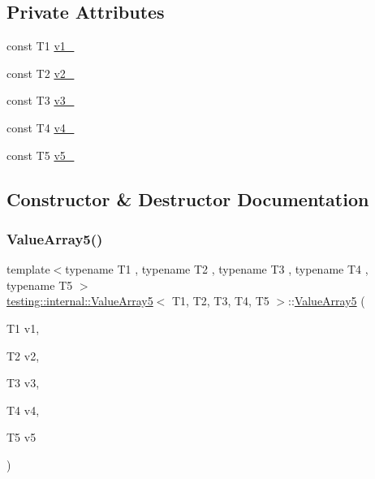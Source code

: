 \subsection*{Private Attributes}
\begin{DoxyCompactItemize}
\item 
const T1 \mbox{\hyperlink{classtesting_1_1internal_1_1_value_array5_ab1e37607826887ea3c6e7dbce3dba56c}{v1\+\_\+}}
\item 
const T2 \mbox{\hyperlink{classtesting_1_1internal_1_1_value_array5_abd1b80884707b9f0c7d7e31784836fde}{v2\+\_\+}}
\item 
const T3 \mbox{\hyperlink{classtesting_1_1internal_1_1_value_array5_a1670c7dfe112d9a38dfb60a64782f255}{v3\+\_\+}}
\item 
const T4 \mbox{\hyperlink{classtesting_1_1internal_1_1_value_array5_afbea18611587e0ae32eab736a49da87b}{v4\+\_\+}}
\item 
const T5 \mbox{\hyperlink{classtesting_1_1internal_1_1_value_array5_a230e3732c5e6865943419df56cd6e210}{v5\+\_\+}}
\end{DoxyCompactItemize}


\subsection{Constructor \& Destructor Documentation}
\mbox{\label{classtesting_1_1internal_1_1_value_array5_a9c5687fd18da21263aebc21b9ea508b8}} 
\subsubsection{\texorpdfstring{ValueArray5()}{ValueArray5()}\hspace{0.1cm}{\footnotesize\ttfamily [1/2]}}
{\footnotesize\ttfamily template$<$typename T1 , typename T2 , typename T3 , typename T4 , typename T5 $>$ \\
\mbox{\hyperlink{classtesting_1_1internal_1_1_value_array5}{testing\+::internal\+::\+Value\+Array5}}$<$ T1, T2, T3, T4, T5 $>$\+::\mbox{\hyperlink{classtesting_1_1internal_1_1_value_array5}{Value\+Array5}} (\begin{DoxyParamCaption}\item[{T1}]{v1,  }\item[{T2}]{v2,  }\item[{T3}]{v3,  }\item[{T4}]{v4,  }\item[{T5}]{v5 }\end{DoxyParamCaption})\hspace{0.3cm}{\ttfamily [inline]}}

